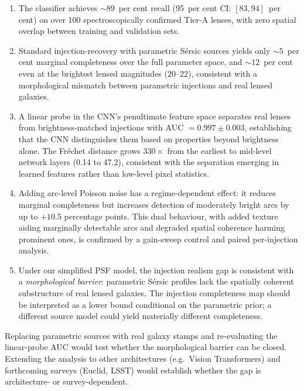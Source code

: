 \documentclass[fleqn,usenatbib]{rasti}
\begin{document}
\begin{enumerate}
\item[(i)] The classifier achieves $\sim\!89$~per cent recall (95~per cent CI: $[83, 94]$~per cent) on over 100 spectroscopically confirmed Tier-A lenses, with zero spatial overlap between training and validation sets.

\item[(ii)] Standard injection-recovery with parametric S\'{e}rsic sources yields only $\sim\!5$~per cent marginal completeness over the full parameter space, and $\sim\!12$~per cent even at the brightest lensed magnitudes ($20$--$22$), consistent with a morphological mismatch between parametric injections and real lensed galaxies.

\item[(iii)] A linear probe in the CNN's penultimate feature space separates real lenses from brightness-matched injections with AUC $= 0.997 \pm 0.003$, establishing that the CNN distinguishes them based on properties beyond brightness alone.  The Fr\'{e}chet distance grows $330\times$ from the earliest to mid-level network layers (0.14 to 47.2), consistent with the separation emerging in learned features rather than low-level pixel statistics.

\item[(iv)] Adding arc-level Poisson noise has a regime-dependent effect: it reduces marginal completeness but increases detection of moderately bright arcs by up to $+10.5$ percentage points.  This dual behaviour, with added texture aiding marginally detectable arcs and degraded spatial coherence harming prominent ones, is confirmed by a gain-sweep control and paired per-injection analysis.

\item[(v)] Under our simplified PSF model, the injection realism gap is consistent with a \emph{morphological barrier}: parametric S\'{e}rsic profiles lack the spatially coherent substructure of real lensed galaxies.  The injection completeness map should be interpreted as a lower bound conditional on the parametric prior; a different source model could yield materially different completeness.
\end{enumerate}

Replacing parametric sources with real galaxy stamps \citep[e.g.\ from HUDF, as in][]{Canameras2024} and re-evaluating the linear-probe AUC would test whether the morphological barrier can be closed.  Extending the analysis to other architectures (e.g.\ Vision Transformers) and forthcoming surveys (Euclid, LSST) would establish whether the gap is architecture- or survey-dependent.
\end{document}
